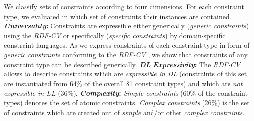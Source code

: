 \documentclass[a4paper,fontsize=11pt]{scrartcl}
\begin{document}
We classify sets of constraints according to four dimensions.
For each constraint type, we evaluated \cite{BoschNolleAcarEckert2015} in which set of constraints their instances are contained.
\textbf{\emph{Universality}:}
Constraints are expressible either generically (\emph{generic constraints}) using the \emph{RDF-CV}   
or specifically (\emph{specific constraints}) by domain-specific constraint languages. 
As we express constraints of each constraint type in form of \emph{generic constraints} conforming to the \emph{RDF-CV} \cite{BoschNolleAcarEckert2015},
we show that constraints of any constraint type can be described generically.
\textbf{\emph{DL Expressivity}:}
The \emph{RDF-CV} allows to describe 
constraints which are \emph{expressible in DL} (constraints of this set are instantiated from 64\% of the overall 81 constraint types) and which are \emph{not expressible in DL} (36\%). 
\textbf{\emph{Complexity}:}
\emph{Simple constraints} (60\% of the constraint types) denotes the set of atomic constraints. 
\emph{Complex constraints} (26\%) is the set of constraints which are created out of \emph{simple} and/or other \emph{complex constraints}.
\end{document}
